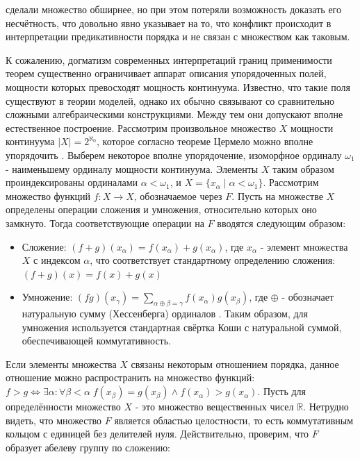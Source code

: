 \documentclass[12pt]{article}
\begin{document}
сделали множество обширнее, но при этом потеряли возможность доказать его несчётность, что довольно явно указывает на то, что конфликт происходит в интерпретации предикативности порядка и не связан с множеством как таковым.

К сожалению, догматизм современных интерпретаций границ применимости теорем существенно ограничивает аппарат описания упорядоченных полей, мощности которых превосходят мощность континуума. Известно, что такие поля существуют в теории моделей, однако их обычно связывают со сравнительно сложными алгебраическими конструкциями. Между тем они допускают вполне естественное построение. Рассмотрим произвольное множество $X$ мощности континуума $|X| = 2^{\aleph_0}$, которое согласно теореме Цермело можно вполне упорядочить \cite{zermelo-well-order}. Выберем некоторое вполне упорядочение, изоморфное ординалу $\omega_1$ - наименьшему ординалу мощности континуума. Элементы $X$ таким образом проиндексированы ординалами $\alpha < \omega_1$, и $X = \{ x_{\alpha} \mid \alpha < \omega_1 \}$. Рассмотрим множество функций $f : X \to X$, обозначаемое через $F$. Пусть на множестве $X$ определены операции сложения и умножения, относительно которых оно замкнуто. Тогда соответствующие операции на $F$ вводятся следующим образом:

\begin{itemize}
    \item Сложение: $(f + g)(x_{\alpha}) = f(x_{\alpha}) + g(x_{\alpha})$, где $x_{\alpha}$ - элемент множества $X$ с индексом $\alpha$, что соответствует стандартному определению сложения: $(f + g)(x) = f(x) + g(x)$
    \item Умножение: $(fg)(x_{\gamma}) = \sum\limits_{\alpha \oplus \beta = \gamma} f(x_{\alpha})g(x_{\beta})$, где $\oplus$ - обозначает натуральную сумму (Хессенберга) ординалов \cite{hessenberg-sum}. Таким образом, для умножения используется стандартная свёртка Коши с натуральной суммой, обеспечивающей коммутативность.
\end{itemize}

Если элементы множества $X$ связаны некоторым отношением порядка, данное отношение можно распространить на множество функций: $f > g \Leftrightarrow \exists \alpha : \forall \beta < \alpha \; f(x_{\beta}) = g(x_{\beta}) \wedge f(x_{\alpha}) > g(x_{\alpha})$. Пусть для определённости множество $X$ - это множество вещественных чисел $\mathbb{R}$. Нетрудно видеть, что множество $F$ является областью целостности, то есть коммутативным кольцом с единицей без делителей нуля. Действительно, проверим, что $F$ образует абелеву группу по сложению:
\end{document}
